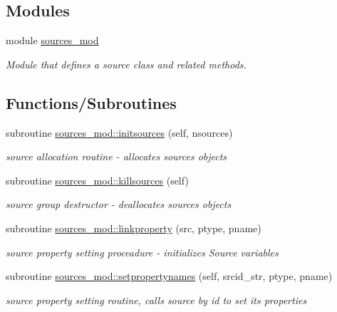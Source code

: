 \subsection*{Modules}
\begin{DoxyCompactItemize}
\item 
module \mbox{\hyperlink{namespacesources__mod}{sources\+\_\+mod}}
\begin{DoxyCompactList}\small\item\em Module that defines a source class and related methods. \end{DoxyCompactList}\end{DoxyCompactItemize}
\subsection*{Functions/\+Subroutines}
\begin{DoxyCompactItemize}
\item 
subroutine \mbox{\hyperlink{namespacesources__mod_a6da3303e5c39d77c0111ec50623bf5fe}{sources\+\_\+mod\+::initsources}} (self, nsources)
\begin{DoxyCompactList}\small\item\em source allocation routine -\/ allocates sources objects \end{DoxyCompactList}\item 
subroutine \mbox{\hyperlink{namespacesources__mod_aee745aa084adcfa41ecfc3469b90aa8e}{sources\+\_\+mod\+::killsources}} (self)
\begin{DoxyCompactList}\small\item\em source group destructor -\/ deallocates sources objects \end{DoxyCompactList}\item 
subroutine \mbox{\hyperlink{namespacesources__mod_a683ca7e4aca7a0050aad9f506569fca9}{sources\+\_\+mod\+::linkproperty}} (src, ptype, pname)
\begin{DoxyCompactList}\small\item\em source property setting proceadure -\/ initializes Source variables \end{DoxyCompactList}\item 
subroutine \mbox{\hyperlink{namespacesources__mod_aa76f16f8ee96bc86b553aa54d420321c}{sources\+\_\+mod\+::setpropertynames}} (self, srcid\+\_\+str, ptype, pname)
\begin{DoxyCompactList}\small\item\em source property setting routine, calls source by id to set its properties \end{DoxyCompactList}\item 

\end{DoxyCompactItemize}
